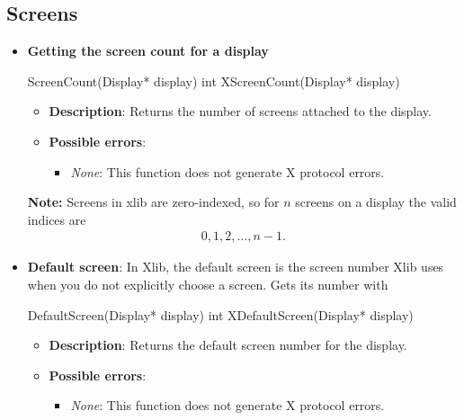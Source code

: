 \documentclass{report}
\begin{document}
    \subsection{Screens}
    \begin{itemize}
        \item \textbf{Getting the screen count for a display}
            \bigbreak \noindent 
            \begin{cppcode}
                ScreenCount(Display* display)
                int XScreenCount(Display* display)
            \end{cppcode}
            \begin{itemize}
                \item \textbf{Description}: Returns the number of screens attached to the display.
                \item \textbf{Possible errors}:
                    \begin{itemize}
                        \item \textit{None}: This function does not generate X protocol errors.
                    \end{itemize}
            \end{itemize}
            \textbf{Note:} Screens in xlib are zero-indexed, so for $n$ screens on a display the valid indices are
            \begin{align*}
                0,1,2,\ldots,n-1
            .\end{align*}
        \item \textbf{Default screen}: In Xlib, the default screen is the screen number Xlib uses when you do not explicitly choose a screen.
            \bigbreak \noindent 
            Gets its number with 
            \bigbreak \noindent 
            \begin{cppcode}
                DefaultScreen(Display* display)
                int XDefaultScreen(Display* display)
            \end{cppcode}
            \begin{itemize}
                \item \textbf{Description}: Returns the default screen number for the display.
                \item \textbf{Possible errors}:
                    \begin{itemize}
                        \item \textit{None}: This function does not generate X protocol errors.
                    \end{itemize}

\end{itemize}
\end{itemize}
\end{document}
